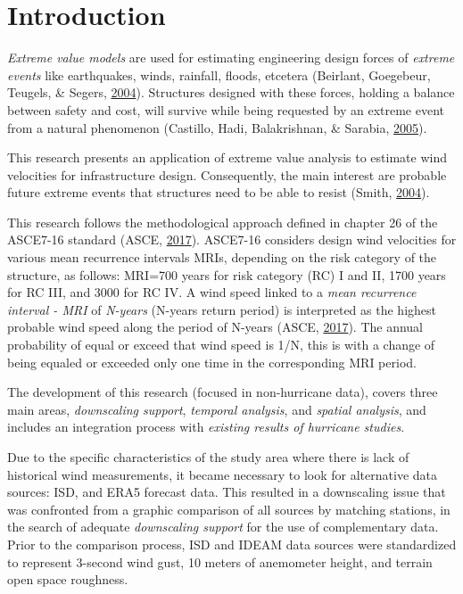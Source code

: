 \documentclass[12pt,oneside]{reedthesis}
\begin{document}
\hypertarget{introduction}{%
\chapter{Introduction}\label{introduction}}

\emph{Extreme value models} are used for estimating engineering design forces of \emph{extreme events} like earthquakes, winds, rainfall, floods, etcetera (Beirlant, Goegebeur, Teugels, \& Segers, \protect\hyperlink{ref-Beirlant2004}{2004}). Structures designed with these forces, holding a balance between safety and cost, will survive while being requested by an extreme event from a natural phenomenon (Castillo, Hadi, Balakrishnan, \& Sarabia, \protect\hyperlink{ref-Castillo2005}{2005}).

This research presents an application of extreme value analysis to estimate wind velocities for infrastructure design. Consequently, the main interest are probable future extreme events that structures need to be able to resist (Smith, \protect\hyperlink{ref-Smith2004}{2004}).

This research follows the methodological approach defined in chapter 26 of the ASCE7-16 standard (ASCE, \protect\hyperlink{ref-Asce2017}{2017}). ASCE7-16 considers design wind velocities for various mean recurrence intervals MRIs, depending on the risk category of the structure, as follows: MRI=700 years for risk category (RC) I and II, 1700 years for RC III, and 3000 for RC IV. A wind speed linked to a \emph{mean recurrence interval - MRI} of \emph{N-years} (N-years return period) is interpreted as the highest probable wind speed along the period of N-years (ASCE, \protect\hyperlink{ref-Asce2017}{2017}). The annual probability of equal or exceed that wind speed is 1/N, this is with a change of being equaled or exceeded only one time in the corresponding MRI period.

The development of this research (focused in non-hurricane data), covers three main areas, \emph{downscaling support}, \emph{temporal analysis}, and \emph{spatial analysis}, and includes an integration process with \emph{existing results of hurricane studies}.

Due to the specific characteristics of the study area where there is lack of historical wind measurements, it became necessary to look for alternative data sources: ISD, and ERA5 forecast data. This resulted in a downscaling issue that was confronted from a graphic comparison of all sources by matching stations, in the search of adequate \emph{downscaling support} for the use of complementary data. Prior to the comparison process, ISD and IDEAM data sources were standardized to represent 3-second wind gust, 10 meters of anemometer height, and terrain open space roughness.
\end{document}
